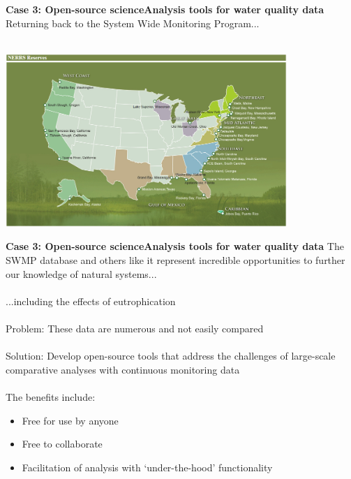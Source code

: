 \documentclass[serif]{beamer}\usepackage[]{graphicx}\usepackage[]{color}
\begin{document}
\begin{frame}{\textbf{Case 3: Open-source science}}{\textbf{Analysis tools for water quality data}}
Returning back to the System Wide Monitoring Program...\\~\\
\centerline{\includegraphics[width = 0.8\textwidth]{fig/NERRS_locations.png}}
\end{frame}

\begin{frame}{\textbf{Case 3: Open-source science}}{\textbf{Analysis tools for water quality data}}
\onslide<+->
The SWMP database and others like it represent incredible opportunities to further our knowledge of natural systems...\\~\\
...including the effects of eutrophication \\~\\
\onslide<+->
\alert{Problem:} These data are numerous and not easily compared\\~\\
\alert{Solution:} Develop open-source tools that address the challenges of large-scale comparative analyses with continuous monitoring data\\~\\
\onslide<+->
The benefits include:
\begin{itemize}
\item Free for use by anyone
\item Free to collaborate
\item Facilitation of analysis with `under-the-hood' functionality
\end{itemize}
\end{frame}
\end{document}
